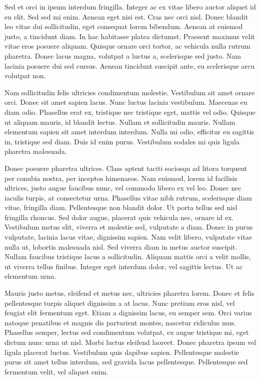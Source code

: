 Sed et orci in ipsum interdum fringilla. Integer ac ex vitae libero auctor
aliquet id eu elit. Sed sed mi enim. Aenean eget nisi est. Cras nec orci nisl.
Donec blandit leo vitae dui sollicitudin, eget consequat lorem bibendum. Aenean
at euismod justo, a tincidunt diam. In hac habitasse platea dictumst. Praesent
maximus velit vitae eros posuere aliquam. Quisque ornare orci tortor, ac
vehicula nulla rutrum pharetra. Donec lacus magna, volutpat a luctus a,
scelerisque sed justo. Nam lacinia posuere dui sed cursus. Aenean tincidunt
suscipit ante, eu scelerisque arcu volutpat non.

Nam sollicitudin felis ultricies condimentum molestie. Vestibulum sit amet
ornare orci. Donec sit amet sapien lacus. Nunc luctus lacinia vestibulum.
Maecenas eu diam odio. Phasellus erat ex, tristique nec tristique eget, mattis
vel odio. Quisque ut aliquam mauris, id blandit lectus. Nullam et sollicitudin
mauris. Nullam elementum sapien sit amet interdum interdum. Nulla mi odio,
efficitur eu sagittis in, tristique sed diam. Duis id enim purus. Vestibulum
sodales mi quis ligula pharetra malesuada.

Donec posuere pharetra ultrices. Class aptent taciti sociosqu ad litora
torquent per conubia nostra, per inceptos himenaeos. Nam euismod, lorem id
facilisis ultrices, justo augue faucibus nunc, vel commodo libero ex vel leo.
Donec nec iaculis turpis, at consectetur urna. Phasellus vitae nibh rutrum,
scelerisque diam vitae, fringilla diam. Pellentesque non blandit dolor. Ut
porta tellus sed nisl fringilla rhoncus. Sed dolor augue, placerat quis
vehicula nec, ornare id ex. Vestibulum metus elit, viverra et molestie sed,
vulputate a diam. Donec in purus vulputate, lacinia lacus vitae, dignissim
sapien. Nam velit libero, vulputate vitae nulla ut, lobortis malesuada nisl.
Sed viverra diam in metus auctor suscipit. Nullam faucibus tristique lacus a
sollicitudin. Aliquam mattis orci a velit mollis, ut viverra tellus finibus.
Integer eget interdum dolor, vel sagittis lectus. Ut ac elementum urna.

Mauris justo metus, eleifend et metus nec, ultricies pharetra lorem. Donec et
felis pellentesque turpis aliquet dignissim a at lacus. Nunc pretium eros nisl,
vel feugiat elit fermentum eget. Etiam a dignissim lacus, eu semper sem. Orci
varius natoque penatibus et magnis dis parturient montes, nascetur ridiculus
mus. Phasellus semper, lectus sed condimentum volutpat, ex augue tristique mi,
eget dictum nunc urna ut nisl. Morbi luctus eleifend laoreet. Donec pharetra
ipsum vel ligula placerat luctus. Vestibulum quis dapibus sapien. Pellentesque
molestie purus sit amet tellus interdum, sed gravida lacus pellentesque.
Pellentesque sed fermentum velit, vel aliquet enim.

